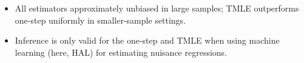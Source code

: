 \documentclass[landscape,a0paper,fontscale=0.285]{baposter} %
\begin{document}
\begin{poster}
{\begin{multicols}{2}


\begin{itemize}
  \itemsep0pt
  \item All estimators approximately unbiased in large samples; TMLE outperforms
    one-step uniformly in smaller-sample settings.
  \item Inference is only valid for the one-step and TMLE when using machine
    learning (here, HAL) for estimating nuisance regressions.\\
\end{itemize}

\end{multicols}
}


\end{poster}
\end{document}

